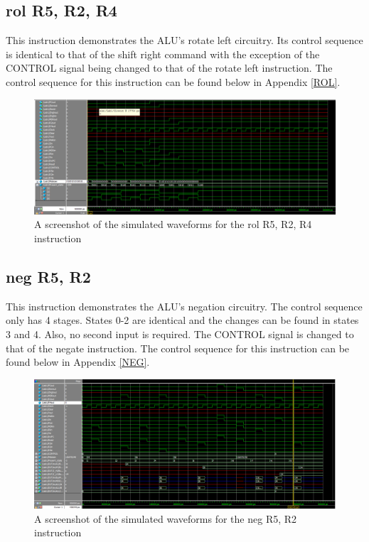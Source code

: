 \documentclass{article}
\begin{document}
    \subsection{rol R5, R2, R4}
    This instruction demonstrates the ALU's rotate left circuitry. Its control sequence is identical to that of the shift right command with the exception of the CONTROL signal being changed to that of the rotate left instruction. The control sequence for this instruction can be found below in Appendix \ref{ROL}.

    \begin{figure}[h!]
        \begin{center}
            \includegraphics[width=13cm]{rol}
            \caption{A screenshot of the simulated waveforms for the rol R5, R2, R4 instruction}
        \end{center}
    \end{figure}

    \subsection{neg R5, R2}
    This instruction demonstrates the ALU's negation circuitry. The control sequence only has 4 stages. States 0-2 are identical and the changes can be found in states 3 and 4. Also, no second input is required. The CONTROL signal is changed to that of the negate instruction. The control sequence for this instruction can be found below in Appendix \ref{NEG}.

    \begin{figure}[h!]
        \begin{center}
            \includegraphics[width=13cm]{NEG_final_image.png}
            \caption{A screenshot of the simulated waveforms for the neg R5, R2 instruction}
        \end{center}
    \end{figure}
\end{document}
